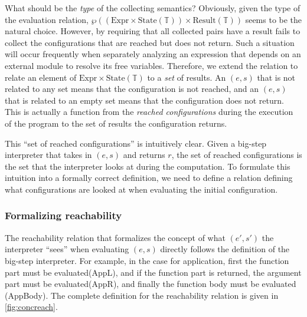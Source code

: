 \documentclass[acmsmall,review]{acmart}\settopmatter{printfolios=true,printccs=false,printacmref=false}
\theoremstyle{definition}
\newcommand*{\Expr}{\text{Expr}}
\newcommand*{\Time}{\mathbb{T}}
\newcommand*{\State}[1]{\text{State}({#1})}
\newcommand*{\Result}[1]{\text{Result}({#1})}
\begin{document}
What should be the \emph{type} of the collecting semantics?
Obviously, given the type of the evaluation relation, $\wp((\Expr\times\State{\Time})\times\Result{\Time})$ seems to be the natural choice.
However, by requiring that all collected pairs have a result fails to collect the configurations that are reached but does not return.
Such a situation will occur frequently when separately analyzing an expression that depends on an external module to resolve its free variables.
Therefore, we extend the relation to relate an element of $\Expr\times\State\Time$ to a \emph{set} of results.
An $(e,s)$ that is not related to any set means that the configuration is not reached, and an $(e,s)$ that is related to an empty set means that the configuration does not return.
This is actually a function from the \emph{reached configurations} during the execution of the program to the set of results the configuration returns.

This ``set of reached configurations'' is intuitively clear.
Given a big-step interpreter that takes in $(e,s)$ and returns $r$, the set of reached configurations is the set that the interpreter looks at during the computation.
To formulate this intuition into a formally correct definition, we need to define a relation defining what configurations are looked at when evaluating the initial configuration.

\subsubsection{Formalizing reachability}

The reachability relation that formalizes the concept of what $(e',s')$ the interpreter ``sees'' when evaluating $(e,s)$ directly follows the definition of the big-step interpreter.
For example, in the case for application, first the function part must be evaluated(AppL), and if the function part is returned, the argument part must be evaluated(AppR), and finally the function body must be evaluated (AppBody).
The complete definition for the reachability relation is given in \ref{fig:concreach}.
\end{document}
